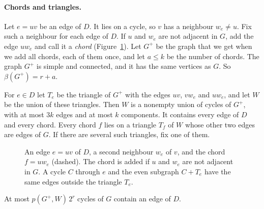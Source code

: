 \paragraph{Chords and triangles.}
Let $e=uv$ be an edge of $D$. It lies on a cycle, so $v$ has a neighbour $w_e\ne u$. Fix such a
neighbour for each edge of $D$. If $u$ and $w_e$ are not adjacent in $G$, add the edge $uw_e$ and
call it a \emph{chord} (Figure~\ref{fig:chord}). Let $G^{+}$ be the graph that we get when we add
all chords, each of them once, and let $a\le k$ be the number of chords. The graph $G^{+}$ is simple
and connected, and it has the same vertices as $G$. So $\beta(G^{+})=r+a$.

For $e\in D$ let $T_e$ be the triangle of $G^{+}$ with the edges $uv$, $vw_e$ and $uw_e$, and let
$W$ be the union of these triangles. Then $W$ is a nonempty union of cycles of $G^{+}$, with at most
$3k$ edges and at most $k$ components. It contains every edge of $D$ and every chord. Every chord
$f$ lies on a triangle $T_f$ of $W$ whose other two edges are edges of $G$. If there are several
such triangles, fix one of them.

\begin{figure}[ht]
\centering
{}
\caption{An edge $e=uv$ of $D$, a second neighbour $w_e$ of $v$, and the chord $f=uw_e$ (dashed).
The chord is added if $u$ and $w_e$ are not adjacent in $G$. A cycle $C$ through $e$ and the even
subgraph $C+T_e$ have the same edges outside the triangle $T_e$.}
\label{fig:chord}
\end{figure}

\begin{lemma}\label{lem:through}
At most $p(G^{+},W)\,2^{r}$ cycles of $G$ contain an edge of $D$.
\end{lemma}


